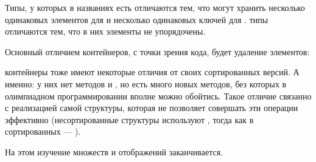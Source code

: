Типы, у которых в названиях есть  отличаются тем, что могут хранить несколько одинаковых элементов для  и несколько одинаковых ключей для .  типы отличаются тем, что в них элементы не упорядочены.

Основный отличием  контейнеров, с точки зрения кода, будет удаление элементов:


 контейнеры тоже имеют некоторые отличия от своих сортированных версий. А именно: у них нет методов  и , но есть много новых методов, без которых в олимпиадном программировании вполне можно обойтись. Такое отличие связанно с реализацией самой структуры, которая не позволяет совершать эти операции эффективно (несортированные структуры используют , тогда как в сортированных — ).

На этом изучение множеств и отображений заканчивается.
